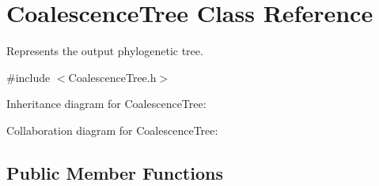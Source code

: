 \hypertarget{class_tree}{}\section{CoalescenceTree Class Reference}
\label{class_tree}


Represents the output phylogenetic tree.  




{\ttfamily \#include $<$CoalescenceTree.\+h$>$}



Inheritance diagram for CoalescenceTree\+:


Collaboration diagram for CoalescenceTree\+:
\subsection*{Public Member Functions}
